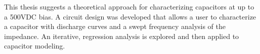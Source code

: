 This thesis suggests a theoretical approach for characterizing capacitors at up to a 500VDC bias. A circuit design was developed that allows a user to characterize a capacitor with discharge curves and a swept frequency analysis of the impedance. An iterative, regression analysis is explored and then applied to capacitor modeling.
\label{sec:abstract}


